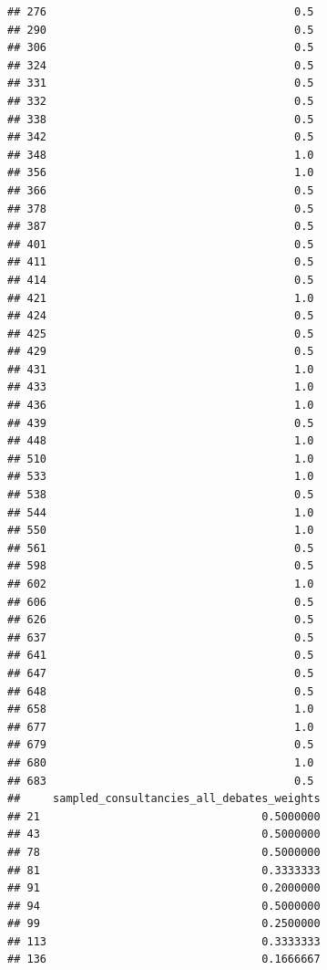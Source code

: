 \documentclass[
]{article}
\begin{document}
\begin{verbatim}
## 276                                      0.5
## 290                                      0.5
## 306                                      0.5
## 324                                      0.5
## 331                                      0.5
## 332                                      0.5
## 338                                      0.5
## 342                                      0.5
## 348                                      1.0
## 356                                      1.0
## 366                                      0.5
## 378                                      0.5
## 387                                      0.5
## 401                                      0.5
## 411                                      0.5
## 414                                      0.5
## 421                                      1.0
## 424                                      0.5
## 425                                      0.5
## 429                                      0.5
## 431                                      1.0
## 433                                      1.0
## 436                                      1.0
## 439                                      0.5
## 448                                      1.0
## 510                                      1.0
## 533                                      1.0
## 538                                      0.5
## 544                                      1.0
## 550                                      1.0
## 561                                      0.5
## 598                                      0.5
## 602                                      1.0
## 606                                      0.5
## 626                                      0.5
## 637                                      0.5
## 641                                      0.5
## 647                                      0.5
## 648                                      0.5
## 658                                      1.0
## 677                                      1.0
## 679                                      0.5
## 680                                      1.0
## 683                                      0.5
##     sampled_consultancies_all_debates_weights
## 21                                  0.5000000
## 43                                  0.5000000
## 78                                  0.5000000
## 81                                  0.3333333
## 91                                  0.2000000
## 94                                  0.5000000
## 99                                  0.2500000
## 113                                 0.3333333
## 136                                 0.1666667

\end{verbatim}
\end{document}
